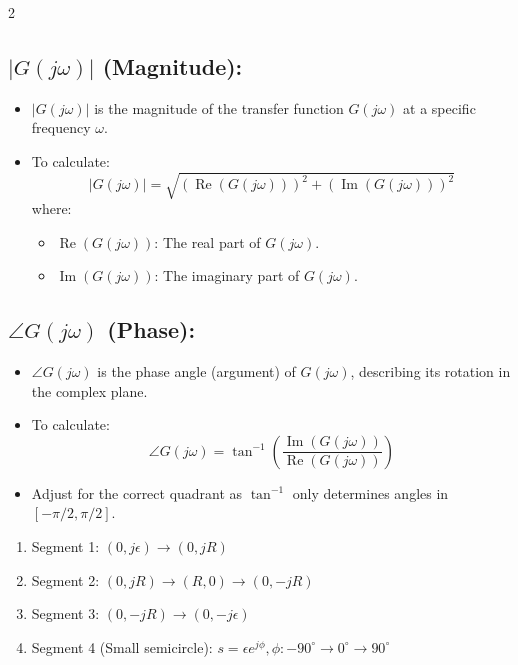 \documentclass[letterpaper,10pt]{article}
\begin{document}
\begin{multicols}{2}
\subsection*{\( |G(j\omega)| \) (Magnitude):}
\begin{itemize}
    \item \( |G(j\omega)| \) is the magnitude of the transfer function \( G(j\omega) \) at a specific frequency \( \omega \).
    \item To calculate:
    \[
    |G(j\omega)| = \sqrt{\left(\operatorname{Re}(G(j\omega))\right)^2 + \left(\operatorname{Im}(G(j\omega))\right)^2}
    \]
    where:
    \begin{itemize}
        \item \( \operatorname{Re}(G(j\omega)) \): The real part of \( G(j\omega) \).
        \item \( \operatorname{Im}(G(j\omega)) \): The imaginary part of \( G(j\omega) \).
    \end{itemize}
\end{itemize}

\subsection*{\( \angle G(j\omega) \) (Phase):}
\begin{itemize}
    \item \( \angle G(j\omega) \) is the phase angle (argument) of \( G(j\omega) \), describing its rotation in the complex plane.
    \item To calculate:
    \[
    \angle G(j\omega) = \tan^{-1} \left( \frac{\operatorname{Im}(G(j\omega))}{\operatorname{Re}(G(j\omega))} \right)
    \]
    \item Adjust for the correct quadrant as \( \tan^{-1} \) only determines angles in \( [-\pi/2, \pi/2] \).
\end{itemize}

\begin{enumerate}
    \item Segment 1: \((0, j\epsilon) \to (0, jR)\)
    \item Segment 2: \((0, jR) \to (R, 0) \to (0, -jR)\)
    \item Segment 3: \((0, -jR) \to (0, -j\epsilon)\)
    \item Segment 4 (Small semicircle): \(s = \epsilon e^{j\phi}, \phi: -90^\circ \to 0^\circ \to 90^\circ\)
\end{enumerate}

\end{multicols}
\end{document}
